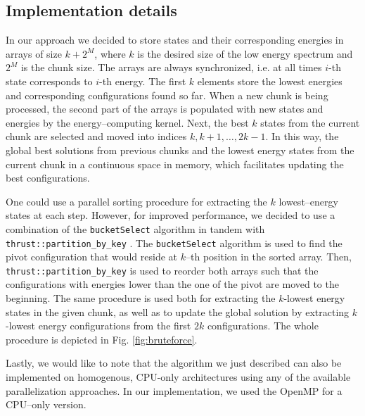 \subsection{Implementation details}

In our approach we decided to store states and their corresponding energies in
arrays of size $k+2^{M}$, where $k$ is the desired size of the low energy
    spectrum and $2^{M}$ is the chunk size. The arrays are always synchronized,
    i.e. at all times $i$-th state corresponds to $i$-th energy. The first $k$
    elements store the lowest energies and corresponding configurations found so
    far. When a new chunk is being processed, the second part of the arrays is
    populated with new states and energies by the energy--computing kernel. Next,
    the best $k$ states from the current chunk are selected and moved into indices
  $k, k+1,\ldots,2k-1$. In this way, the global best solutions from previous
    chunks and the lowest energy states from the current chunk in a continuous
    space in memory, which facilitates updating the best configurations.

    One could use a parallel sorting procedure for extracting the $k$
lowest--energy states at each step. However, for improved performance, we
decided to use a combination of the \texttt{bucketSelect} \cite{bucketselect}
algorithm in tandem with \texttt{thrust::partition\_by\_key} \cite{thrust}. The
\texttt{bucketSelect} algorithm is used to find the pivot configuration that
would reside at $k$--th position in the sorted array. Then,
\texttt{thrust::partition\_by\_key} is used to reorder both arrays such that
the configurations with energies lower than the one of the pivot are moved to
the beginning. The same procedure is used both for extracting the $k$-lowest
energy states in the given chunk, as well as to update the global solution by
extracting $k$-lowest energy configurations from the first $2k$ configurations.
The whole procedure is depicted in Fig. \ref{fig:bruteforce}.

Lastly, we would like to note that the algorithm we just described can also be
implemented on homogenous, CPU-only architectures using any of the available
parallelization approaches. In our implementation, we used the
OpenMP\cite{openmp} for a CPU--only version.

